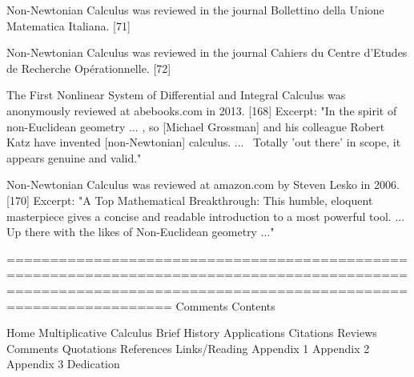 \documentclass[12pt]{article}
\begin{document}
Non-Newtonian Calculus was reviewed in the journal Bollettino della Unione Matematica Italiana. [71]

Non-Newtonian Calculus was reviewed in the journal Cahiers du Centre d'Etudes de Recherche Opérationnelle. [72]

The First Nonlinear System of Differential and Integral Calculus was anonymously reviewed at abebooks.com in 2013. [168]
Excerpt: "In the spirit of non-Euclidean geometry ... , so [Michael Grossman] and his colleague Robert Katz have invented [non-Newtonian] calculus. ...  Totally 'out there' in scope, it appears genuine and valid."

Non-Newtonian Calculus was reviewed at amazon.com by Steven Lesko in 2006. [170]
Excerpt: "A Top Mathematical Breakthrough: This humble, eloquent masterpiece gives a concise and readable introduction to a most powerful tool. ... Up there with the likes of Non-Euclidean geometry ..."

=============================================================================================================================================================
Comments
Contents

Home
Multiplicative Calculus
Brief History
Applications
Citations
Reviews
Comments
Quotations
References
Links/Reading
Appendix 1
Appendix 2
Appendix 3
Dedication
\end{document}
